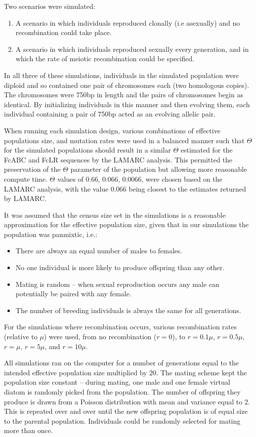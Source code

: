 Two scenarios were simulated:
\begin{enumerate}
\item A scenario in which individuals reproduced clonally (i.e asexually) and no recombination could take place.
\item A scenario in which individuals reproduced sexually every generation, and in which the rate of meiotic recombination could be specified.
\end{enumerate}

In all three of these simulations, individuals in the simulated population were diploid and so contained one pair of chromosomes each (two homologous copies).
The chromosomes were 750bp in length and the pairs of chromosomes begin as identical. By initializing individuals in this manner and then evolving them, each individual containing a pair of 750bp acted as an evolving allelic pair.

When running each simulation design, various combinations of effective populations size, and mutation rates were used in a balanced manner such that $\Theta$ for the simulated populations should result in a similar $\Theta$ estimated for the FcABC and FcLR sequences by the LAMARC analysis.
This permitted the preservation of the $\Theta$ parameter of the population but allowing more reasonable compute time. $\Theta$ values of 0.66, 0.066, 0.0066, were chosen based on the LAMARC analysis, with the value 0.066 being closest to the estimates returned by LAMARC.

It was assumed that the census size set in the simulations is a reasonable approximation for the effective population size, given that in our simulations the population was panmixtic, i.e.:
\begin{itemize}
\item There are always an equal number of males to females.
\item No one individual is more likely to produce offspring than any other.
\item Mating is random – when sexual reproduction occurs any male can potentially be paired with any female.
\item The number of breeding individuals is always the same for all generations.
\end{itemize}
For the simulations where recombination occurs, various recombination rates (relative to $\mu$) were used, from no recombination ($r = 0$), to $r = 0.1\mu$, $r = 0.5\mu$, $r = \mu$, $r = 5\mu$, and $r = 10\mu$.

All simulations ran on the computer for a number of generations equal to the intended effective population size multiplied by 20.
The mating scheme kept the population size constant – during mating, one male and one female virtual diatom is randomly picked from the population.
The number of offspring they produce is drawn from a Poisson distribution with mean and variance equal to 2.
This is repeated over and over until the new offspring population is of equal size to the parental population.
Individuals could be randomly selected for mating more than once.

